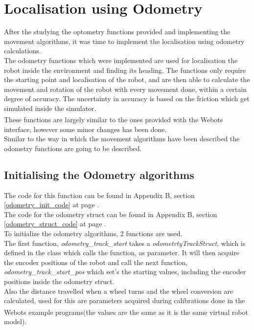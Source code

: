\section{Localisation using Odometry}
After the studying the optometry functions provided and implementing the movement algorithms, it was time to implement the localisation using odometry calculations.\\
The odometry functions which were implemented are used for localisation the robot inside the environment and finding its heading. The functions only require the starting point and localisation of the robot, and are then able to calculate the movement and rotation of the robot with every movement done, within a certain degree of accuracy. The uncertainty in accuracy is based on the friction which get simulated inside the simulator. \\
These functions are largely similar to the ones provided with the Webots\textsuperscript{\texttrademark} interface, however some minor changes has been done. \\
Similar to the way in which the movement algorithms have been described the odometry functions are going to be described.

\subsection{Initialising the Odometry algorithms}
\label{odometry_init_description}
The code for this function can be found in Appendix B, section \ref{odometry_init_code} at page \pageref{odometry_init_code}.\\
The code for the odometry struct can be found in Appendix B, section \ref{odometry_struct_code} at page \pageref{odometry_struct_code}.\\
To initialize the odometry algorithms, 2 functions are used. \\
The first function, \textit{odometry\_track\_start} takes a \textit{odometrtyTrackStruct}, which is defined in the class which calls the function, as parameter. It will then acquire the encoder positions of the robot and call the next function, \textit{odometry\_track\_start\_pos} which set's the starting values, including the encoder positions inside the odometry struct.\\[3ex]


Also the distance travelled when a wheel turns and the wheel conversion are calculated, used for this are parameters acquired during calibrations done in the Webots \textsuperscript{\texttrademark} example programs(the values are the same as it is the same virtual robot model).

